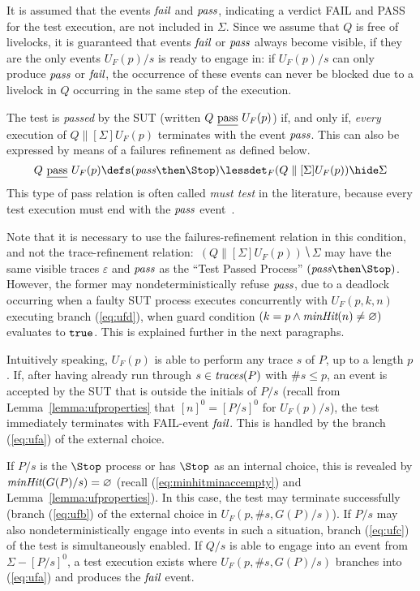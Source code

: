 It is assumed that the events ${\text{\it fail}}$ and ${\text{\it pass}}$, indicating a verdict
FAIL and PASS for the test execution, are not included in $\Sigma$. Since we
assume that $Q$ is free of livelocks, it is guaranteed that events ${\text{\it fail}}$
or ${\text{\it pass}}$ always become visible, if they are the only events $U_F(p)/s$ is
ready to engage in: if $U_F(p)/s$ can only produce ${\text{\it pass}}$ or ${\text{\it fail}}$, the
occurrence of these events can never be blocked due to a livelock in $Q$
occurring in the same step of the execution.


The test is \emph{passed} by the SUT (written $Q\ \underline{\text{pass}}\ U_F(p)$) if, and
only if, {\it every} execution of $Q\parallel[\Sigma] U_F(p)$ terminates with
the event ${\text{\it pass}}$. This can also be  expressed by means of a failures
refinement as defined below.
%
\begin{equation}
\label{eq:passF}
Q\ \pass\ U_F(p) \defs (\epass\then\Stop) \lessdet_F (Q\parallel[\Sigma] U_F(p)) \hide \Sigma
\end{equation}
%
This type of pass relation is often called \emph{must test} in the
literature, because every test execution must end with the ${\text{\it pass}}$
event~\cite{Hennessy:1988:ATP:50497}.

Note that it is necessary to use the failures-refinement relation in this
condition, and not the trace-refinement relation:~$(Q\parallel[\Sigma]
U_F(p)) \hide \Sigma$ may have  the same visible traces $\varepsilon$ and
${\text{\it pass}}$ as the ``Test Passed Process'' $(\epass\then\Stop)$. However, the
former may nondeterministically refuse ${\text{\it pass}}$, due to a deadlock occurring
when a faulty SUT process executes concurrently with $U_F(p,k,n)$ executing
branch (\ref{eq:ufd}), when guard condition $(k = p\wedge
\text{\it minHit}(n)\neq\varnothing)$ evaluates to $\mbox{{\tt true}}$. This is explained further
in the next paragraphs.

Intuitively speaking, $U_F(p)$ is able to perform any trace $s$ of $P$, up to
a length $p$. If, after having already run through $s\in\text{\it traces}(P)$ with $\#s
\le p$, an event is accepted by the SUT that is outside the initials of $P/s$
 (recall from Lemma~\ref{lemma:ufproperties} that $[n]^0 = [P/s]^0$ for $U_F(p)/s$),
the test immediately terminates with FAIL-event ${\text{\it fail}}$. This is handled by
the branch (\ref{eq:ufa}) of the external choice. %

If $P/s$ is the $\Stop$ process or has $\Stop$ as an internal choice, this is
revealed by $\text{\it minHit}(G(P)/s) = \varnothing$ (recall
(\ref{eq:minhitminaccempty}) and Lemma~\ref{lemma:ufproperties}). In this
case, the test may terminate successfully (branch (\ref{eq:ufb}) of the
external choice in $U_F(p,\#s,G(P)/s)$). If $P/s$ may also
nondeterministically engage into events in such a situation, branch
(\ref{eq:ufc}) of the test is simultaneously enabled. If $Q/s$ is able to
engage into an event from $\Sigma - [P/s]^0$, a test execution exists where
$U_F(p,\#s,G(P)/s)$ branches into (\ref{eq:ufa}) and produces the ${\text{\it fail}}$
event.

